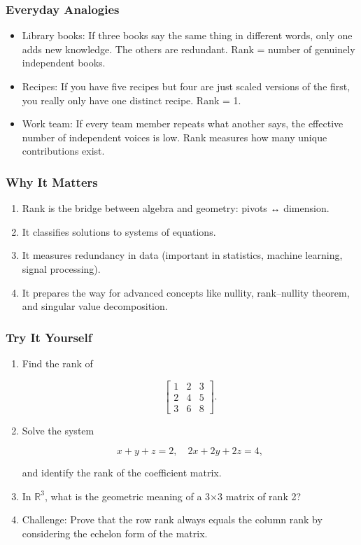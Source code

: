 \documentclass[
  letterpaper,
  DIV=11,
  numbers=noendperiod]{scrreprt}
\providecommand{\tightlist}{%
  \setlength{\itemsep}{0pt}\setlength{\parskip}{0pt}}
\begin{document}
\subsubsection{Everyday Analogies}\label{everyday-analogies-25}

\begin{itemize}
\tightlist
\item
  Library books: If three books say the same thing in different words,
  only one adds new knowledge. The others are redundant. Rank = number
  of genuinely independent books.
\item
  Recipes: If you have five recipes but four are just scaled versions of
  the first, you really only have one distinct recipe. Rank = 1.
\item
  Work team: If every team member repeats what another says, the
  effective number of independent voices is low. Rank measures how many
  unique contributions exist.
\end{itemize}

\subsubsection{Why It Matters}\label{why-it-matters-25}

\begin{enumerate}
\def\labelenumi{\arabic{enumi}.}
\tightlist
\item
  Rank is the bridge between algebra and geometry: pivots ↔ dimension.
\item
  It classifies solutions to systems of equations.
\item
  It measures redundancy in data (important in statistics, machine
  learning, signal processing).
\item
  It prepares the way for advanced concepts like nullity, rank--nullity
  theorem, and singular value decomposition.
\end{enumerate}

\subsubsection{Try It Yourself}\label{try-it-yourself-28}

\begin{enumerate}
\def\labelenumi{\arabic{enumi}.}
\item
  Find the rank of

  \[
  \begin{bmatrix}  
  1 & 2 & 3 \\  
  2 & 4 & 5 \\  
  3 & 6 & 8  
  \end{bmatrix}.
  \]
\item
  Solve the system

  \[
  x + y + z = 2, \quad 2x + 2y + 2z = 4,
  \]

  and identify the rank of the coefficient matrix.
\item
  In \(\mathbb{R}^3\), what is the geometric meaning of a 3×3 matrix of
  rank 2?
\item
  Challenge: Prove that the row rank always equals the column rank by
  considering the echelon form of the matrix.
\end{enumerate}
\end{document}
